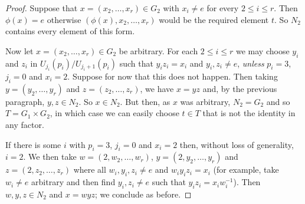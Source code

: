 \documentclass[10pt,a4paper]{amsart}
\begin{document}
\begin{proof}
    Suppose that $x = (x_2, \ldots, x_r) \in G_2$ with $x_i \ne e$ for every $2 \le i \le r$. Then $\phi(x) = e$
    otherwise $(\phi(x), x_2, \ldots, x_r)$ would be the required element $t$. So $N_2$ contains every element of this
    form.

    Now let $x = (x_2, \ldots, x_r) \in G_2$ be arbitrary. For each $2 \le i \le r$ we may choose $y_i$ and $z_i$ in
    $U_{j_i}(p_i)/U_{j_i+1}(p_i)$ such that $y_i z_i = x_i$ and $y_i, z_i \ne e$, \emph{unless} $p_i = 3$, $j_i = 0$ and
    $x_i = 2$. Suppose for now that this does not happen. Then taking $y = (y_2, \ldots, y_r)$ and
    $z = (z_2, \ldots, z_r)$, we have $x = yz$ and, by the previous paragraph, $y, z \in N_2$. So $x \in N_2$. But then,
    as $x$ was arbitrary, $N_2 = G_2$ and so $T = G_1 \times G_2$, in which case we can easily choose $t \in T$ that is
    not the identity in any factor.

    If there is some $i$ with $p_i = 3$, $j_i = 0$ and $x_i = 2$ then, without loss of generality, $i = 2$. We then take
    $w = (2,w_2, \ldots, w_r)$, $y = (2, y_2, \ldots, y_r)$ and $z = (2, z_2, \ldots, z_r)$ where all
    $w_i, y_i, z_i \ne e$ and $w_iy_iz_i = x_i$ (for example, take $w_i \ne e$ arbitrary and then find $y_i, z_i \ne e$
    such that $y_i z_i = x_i w_i^{-1}$). Then $w, y, z \in N_2$ and $x = wyz$; we conclude as before.
\end{proof}
\end{document}
